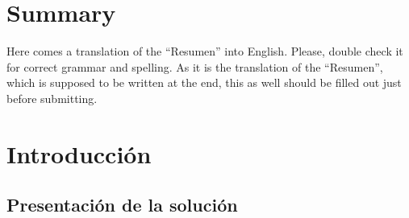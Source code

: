 \documentclass[a4paper, 12pt]{book}
\begin{document}

\chapter*{Summary}

Here comes a translation of the ``Resumen'' into English.
Please, double check it for correct grammar and spelling.
As it is the translation of the ``Resumen'', which is supposed to be written at the end, this as well should be filled out just before submitting.




\tableofcontents
\cleardoublepage
\listoffigures %



\cleardoublepage
\chapter{Introducción}
\label{sec:intro} %

\section{Presentación de la solución}
\label{sec:seccion}
\end{document}
